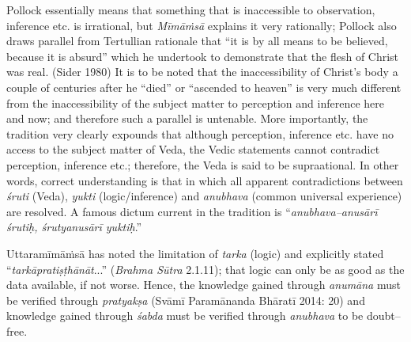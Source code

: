 Pollock essentially means that something that is inaccessible to observation, inference etc. is irrational, but \textit{Mīmāṁsā} explains it very rationally; Pollock also draws parallel from Tertullian rationale that “it is by all means to be believed, because it is absurd” which he undertook to demonstrate that the flesh of Christ was real. (Sider 1980) It is to be noted that the inaccessibility of Christ’s body a couple of centuries after he “died” or “ascended to heaven” is very much different from the inaccessibility of the subject matter to perception and inference here and now; and therefore such a parallel is untenable. More importantly, the tradition very clearly expounds that although perception, inference etc. have no access to the subject matter of Veda, the Vedic statements cannot contradict perception, inference etc.; therefore, the Veda is said to be supraational. In other words, correct understanding is that in which all apparent contradictions between \textit{śruti} (Veda), \textit{yukti }(logic/inference) and \textit{anubhava} (common universal experience) are resolved. A famous dictum current in the tradition is “\textit{anubhava–anusārī śrutiḥ, śrutyanusārī yuktiḥ}.”

Uttaramīmāṁsā has noted the limitation of \textit{tarka} (logic) and explicitly stated “\textit{tarkāpratiṣṭhānāt}...” (\textit{Brahma Sūtra} 2.1.11); that logic can only be as good as the data available, if not worse. Hence, the knowledge gained through \textit{anumāna} must be verified through \textit{pratyakṣa} (Svāmī Paramānanda Bhāratī 2014: 20) and knowledge gained through \textit{śabda} must be verified through \textit{anubhava} to be doubt–free.


